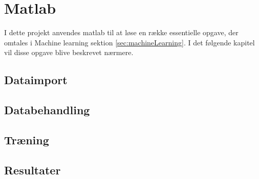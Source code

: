 \thispagestyle{fancy}
\chapter{Matlab}
I dette projekt anvendes matlab til at løse en række essentielle opgave, der omtales i Machine learning sektion \ref{sec:machineLearning}. I det følgende kapitel vil disse opgave blive beskrevet nærmere. 
\label{chp:matlabChapter}

\section{Dataimport}

\section{Databehandling}

\section{Træning}

\section{Resultater}